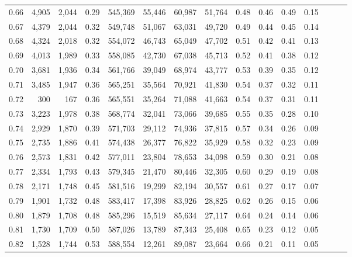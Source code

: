 \begin{tabular}{rrrrrrrrrrrrrrr}
0.66 &   4,905 &  2,044 &  0.29 &  545,369 &   55,446 &   60,987 &   51,764 &  0.48 &  0.46 &  0.49 &      0.15 \\
0.67 &   4,379 &  2,044 &  0.32 &  549,748 &   51,067 &   63,031 &   49,720 &  0.49 &  0.44 &  0.45 &      0.14 \\
0.68 &   4,324 &  2,018 &  0.32 &  554,072 &   46,743 &   65,049 &   47,702 &  0.51 &  0.42 &  0.41 &      0.13 \\
0.69 &   4,013 &  1,989 &  0.33 &  558,085 &   42,730 &   67,038 &   45,713 &  0.52 &  0.41 &  0.38 &      0.12 \\
0.70 &   3,681 &  1,936 &  0.34 &  561,766 &   39,049 &   68,974 &   43,777 &  0.53 &  0.39 &  0.35 &      0.12 \\
0.71 &   3,485 &  1,947 &  0.36 &  565,251 &   35,564 &   70,921 &   41,830 &  0.54 &  0.37 &  0.32 &      0.11 \\
0.72 &     300 &    167 &  0.36 &  565,551 &   35,264 &   71,088 &   41,663 &  0.54 &  0.37 &  0.31 &      0.11 \\
0.73 &   3,223 &  1,978 &  0.38 &  568,774 &   32,041 &   73,066 &   39,685 &  0.55 &  0.35 &  0.28 &      0.10 \\
0.74 &   2,929 &  1,870 &  0.39 &  571,703 &   29,112 &   74,936 &   37,815 &  0.57 &  0.34 &  0.26 &      0.09 \\
0.75 &   2,735 &  1,886 &  0.41 &  574,438 &   26,377 &   76,822 &   35,929 &  0.58 &  0.32 &  0.23 &      0.09 \\
0.76 &   2,573 &  1,831 &  0.42 &  577,011 &   23,804 &   78,653 &   34,098 &  0.59 &  0.30 &  0.21 &      0.08 \\
0.77 &   2,334 &  1,793 &  0.43 &  579,345 &   21,470 &   80,446 &   32,305 &  0.60 &  0.29 &  0.19 &      0.08 \\
0.78 &   2,171 &  1,748 &  0.45 &  581,516 &   19,299 &   82,194 &   30,557 &  0.61 &  0.27 &  0.17 &      0.07 \\
0.79 &   1,901 &  1,732 &  0.48 &  583,417 &   17,398 &   83,926 &   28,825 &  0.62 &  0.26 &  0.15 &      0.06 \\
0.80 &   1,879 &  1,708 &  0.48 &  585,296 &   15,519 &   85,634 &   27,117 &  0.64 &  0.24 &  0.14 &      0.06 \\
0.81 &   1,730 &  1,709 &  0.50 &  587,026 &   13,789 &   87,343 &   25,408 &  0.65 &  0.23 &  0.12 &      0.05 \\
0.82 &   1,528 &  1,744 &  0.53 &  588,554 &   12,261 &   89,087 &   23,664 &  0.66 &  0.21 &  0.11 &      0.05 \\

\end{tabular}
